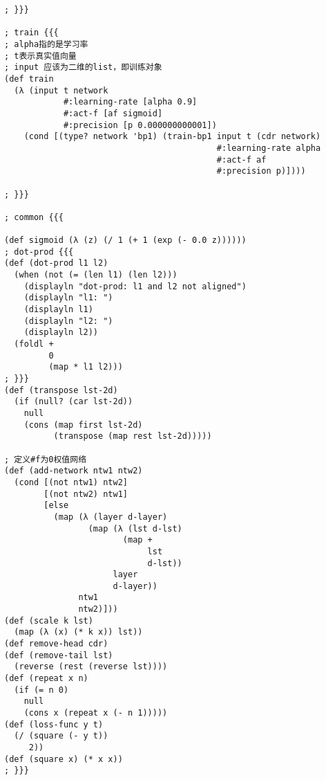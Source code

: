 \documentclass{article}
\begin{document}
\begin{lstlisting}
; }}}

; train {{{
; alpha指的是学习率
; t表示真实值向量
; input 应该为二维的list，即训练对象
(def train
  (λ (input t network
            #:learning-rate [alpha 0.9]
            #:act-f [af sigmoid]
            #:precision [p 0.000000000001])
    (cond [(type? network 'bp1) (train-bp1 input t (cdr network)
                                           #:learning-rate alpha
                                           #:act-f af
                                           #:precision p)])))

; }}}

; common {{{

(def sigmoid (λ (z) (/ 1 (+ 1 (exp (- 0.0 z))))))
; dot-prod {{{
(def (dot-prod l1 l2)
  (when (not (= (len l1) (len l2)))
    (displayln "dot-prod: l1 and l2 not aligned")
    (displayln "l1: ")
    (displayln l1)
    (displayln "l2: ")
    (displayln l2))
  (foldl +
         0
         (map * l1 l2)))
; }}}
(def (transpose lst-2d)
  (if (null? (car lst-2d))
    null
    (cons (map first lst-2d)
          (transpose (map rest lst-2d)))))

; 定义#f为0权值网络
(def (add-network ntw1 ntw2)
  (cond [(not ntw1) ntw2]
        [(not ntw2) ntw1]
        [else
          (map (λ (layer d-layer)
                 (map (λ (lst d-lst)
                        (map +
                             lst
                             d-lst))
                      layer
                      d-layer))
               ntw1
               ntw2)]))
(def (scale k lst)
  (map (λ (x) (* k x)) lst))
(def remove-head cdr)
(def (remove-tail lst)
  (reverse (rest (reverse lst))))
(def (repeat x n)
  (if (= n 0)
    null
    (cons x (repeat x (- n 1)))))
(def (loss-func y t)
  (/ (square (- y t))
     2))
(def (square x) (* x x))
; }}}
  \end{lstlisting}
\end{document}
